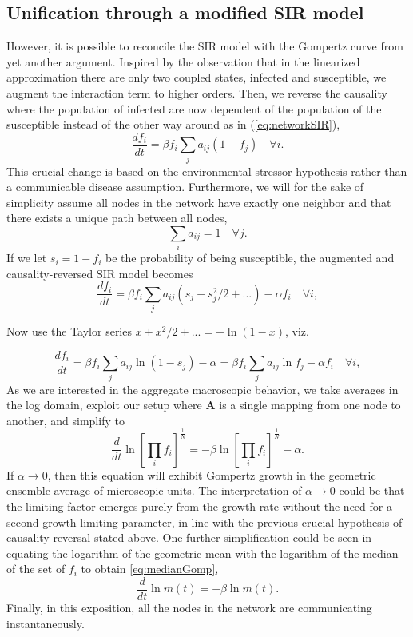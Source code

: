 \documentclass{article}
\begin{document}
\subsection{Unification through a modified SIR model}
However, it is possible to reconcile the SIR model with the Gompertz curve from yet another argument. 
Inspired by the observation that in the linearized approximation there are only two coupled states, infected and susceptible, we augment the interaction term to higher orders. 
Then, we reverse the causality where the population of infected are now dependent of the population of the susceptible instead of the other way around as in (\ref{eq:networkSIR}),
\begin{equation}
\label{eq:reverseNetworkSIR}
\frac{d f_i}{dt} = \beta f_i\sum_j{a_{ij}}(1-f_j) \quad \forall i.
\end{equation} 
This crucial change is based on the environmental stressor hypothesis rather than a communicable disease assumption.
Furthermore, we will for the sake of simplicity assume all nodes in the network have exactly one neighbor and that there exists a unique path between all nodes,
\begin{equation}
\sum_i a_{ij} = 1 \quad \forall j.
\end{equation} 
If we let $s_i = 1 - f_i$ be the probability of being susceptible, the augmented and causality-reversed SIR model becomes 
\begin{equation}
\frac{d f_i}{dt} = \beta f_i\sum_j{a_{ij}}(s_{j} + s^2_j/2 + ...) - \alpha f_i\quad \forall i,
\end{equation}

Now use the Taylor series $x+x^2/2+... = -\ln(1-x)$, viz.

\begin{equation}
\frac{d f_i}{dt} = \beta f_i\sum_j{a_{ij}}\ln{(1 - s_{j})} - \alpha = \beta f_i\sum_j{a_{ij}}\ln{f_{j}} - \alpha f_i \quad \forall i,
\end{equation}
As we are interested in the aggregate macroscopic behavior, we take averages in the log domain, exploit our setup where $\mathbf{A}$ is a single mapping from one node to another, and simplify to
\begin{equation}
\frac{d}{{dt}} \ln\left[\prod_i{f_i}\right]^{\frac{1}{N}} = -\beta\ln\left[\prod_i{f_i}\right]^{\frac{1}{N}} - \alpha.
\end{equation}
If $\alpha\rightarrow 0$, then this equation will exhibit Gompertz growth in the geometric ensemble average of microscopic units. The interpretation of $\alpha\rightarrow 0$ could be that the limiting factor emerges purely from the growth rate without the need for a second growth-limiting parameter, in line with the previous crucial hypothesis of causality reversal stated above. One further simplification could be seen in equating the logarithm of the geometric mean with the logarithm of the median of the set of $f_i$ to obtain \ref{eq:medianGomp},
\begin{equation}
\frac{d}{dt}\ln{m(t)} = -\beta \ln{m(t)}.
\end{equation}
Finally, in this exposition, all the nodes in the network are communicating instantaneously. 
\end{document}
